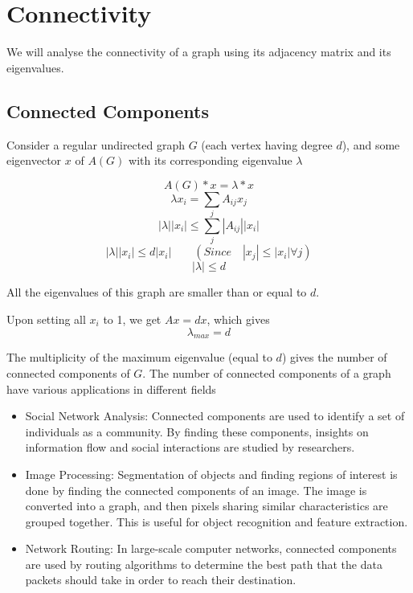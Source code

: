 \documentclass[12pt, a4paper]{article}
\begin{document}
    \section{Connectivity}
    We will analyse the connectivity of a graph using its adjacency matrix and its eigenvalues.

    \subsection{Connected Components \cite{baeldung}}
    \begin{flushleft}
    Consider a regular undirected graph $G$ (each vertex having degree $d$), and some eigenvector $x$ of $A(G)$ with its corresponding eigenvalue $\lambda$

    $$A(G)*x = \lambda*x$$
    $$\lambda x_i = \sum_{j} A_{ij}x_j$$
    $$|\lambda||x_i| \le \sum_{j} |A_{ij}||x_i|$$
    $$ |\lambda||x_i| \le d|x_i| \qquad (Since \quad |x_j| \le |x_i| \forall j)$$
    $$|\lambda| \le d$$

    All the eigenvalues of this graph are smaller than or equal to $d$. \cite{bhaskara4}

    Upon setting all $x_i$ to 1, we get $Ax = dx$, which gives
    $$\lambda_{max} = d$$

      The multiplicity of the maximum eigenvalue (equal to $d$) gives the number of connected components of $G$. \cite{bhaskara5} The number of connected components of a graph have various applications in different fields

      \begin{itemize}
        \item Social Network Analysis: Connected components are used to identify a set of individuals as a community. By finding these components, insights on information flow and social interactions are studied by researchers.
        \item Image Processing: Segmentation of objects and finding regions of interest is done by finding the connected components of an image. The image is converted into a graph, and then pixels sharing similar characteristics are grouped together. This is useful for object recognition and feature extraction.

        \item Network Routing: In large-scale computer networks, connected components are used by routing algorithms to determine the best path that the data packets should take in order to reach their destination.
      \end{itemize}
    \end{flushleft}
\end{document}
